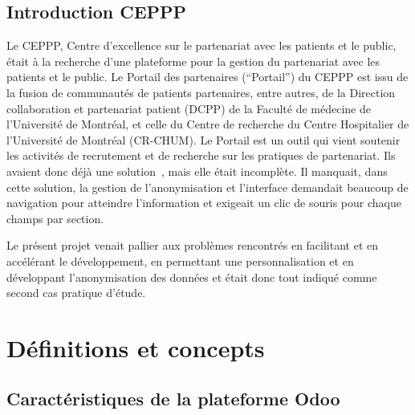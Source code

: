 \subsection{Introduction CEPPP}




Le CEPPP, Centre d’excellence sur le partenariat avec les patients et le public, était à la recherche d'une plateforme pour la gestion du partenariat avec les patients et le public. Le Portail des partenaires (“Portail”) du CEPPP est issu de la fusion de communautés de patients partenaires, entre autres, de la Direction collaboration et partenariat patient (DCPP) de la Faculté de médecine de l’Université de Montréal, et celle du Centre de recherche du Centre Hospitalier de l’Université de Montréal (CR-CHUM). Le Portail est un outil qui vient soutenir les activités de recrutement et de recherche sur les pratiques de partenariat. Ils avaient donc déjà une solution~\cite{github_ceppp_crm}, mais elle était incomplète. Il manquait, dans cette solution, la gestion de l'anonymisation et l'interface demandait beaucoup de navigation pour atteindre l'information et exigeait un clic de souris pour chaque champs par section.

Le présent projet venait pallier aux problèmes rencontrés en facilitant et en accélérant le développement, en permettant une personnalisation et en développant l'anonymisation des données et était donc tout indiqué comme second cas pratique d'étude.





\section{Définitions et concepts}


\subsection{Caractéristiques de la plateforme Odoo}

